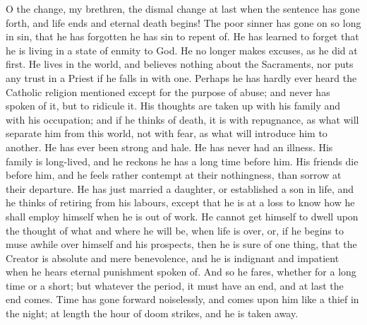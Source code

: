 O the change, my brethren, the dismal change at last when the
sentence has gone forth, and life ends and eternal death begins! The
poor sinner has gone on so long in sin, that he has forgotten he has
sin to repent of. He has learned to forget that he is living in a
state of enmity to God. He no longer makes excuses, as he did at
first. He lives in the world, and believes nothing about the
Sacraments, nor puts any trust in a Priest if he falls in with one.
Perhaps he has hardly ever heard the Catholic religion mentioned
except for the purpose of abuse; and never has spoken of it, but to
ridicule it. His thoughts are taken up with his family and with his
occupation; and if he thinks of death, it is with repugnance, as what
will separate him from this world, not with fear, as what will
introduce him to another. He has ever been strong and hale. He has
never had an illness. His family is long-lived, and he reckons he has
a long time before him. His friends die before him, and he feels
rather contempt at their nothingness, than sorrow at their departure.
He has just married a daughter, or established a son in life, and he
thinks of retiring from his labours, except that he is at a loss to
know how he shall employ himself when he is out of work. He cannot get
himself to dwell upon the thought of what and where he will be, when
life is over, or, if he begins to muse awhile over himself and his
prospects, then he is sure of one thing, that the Creator is absolute
and mere benevolence, and he is indignant and impatient when he hears
eternal punishment spoken of. And so he fares, whether for a long time
or a short; but whatever the period, it must have an end, and at last
the end comes. Time has gone forward noiselessly, and comes upon him
like a thief in the night; at length the hour of doom strikes, and he
is taken away.

